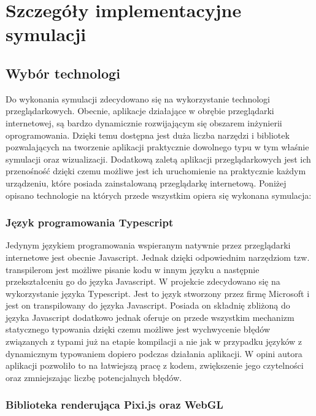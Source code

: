 \chapter{Szczegóły implementacyjne symulacji}
\label{cha:symulacja}

\section{Wybór technologi}

Do wykonania symulacji zdecydowano się na wykorzystanie technologi przeglądarkowych. Obecnie, aplikacje działające w obrębie przeglądarki internetowej, są bardzo dynamicznie rozwijającym się obszarem inżynierii oprogramowania. Dzięki temu dostępna jest duża liczba narzędzi i bibliotek pozwalających na tworzenie aplikacji praktycznie dowolnego typu w tym właśnie symulacji oraz wizualizacji. Dodatkową zaletą aplikacji przeglądarkowych jest ich przenośność dzięki czemu możliwe jest ich uruchomienie na praktycznie każdym urządzeniu, które posiada zainstalowaną przeglądarkę internetową.
Poniżej opisano technologie na których przede wszystkim opiera się wykonana symulacja:

\subsection{Język programowania Typescript}

Jedynym językiem programowania wspieranym natywnie przez przeglądarki internetowe jest obecnie Javascript. Jednak dzięki odpowiednim narzędziom tzw. transpilerom jest możliwe pisanie kodu w innym języku a następnie przekształceniu go do języka Javascript.
W projekcie zdecydowano się na wykorzystanie języka Typescript. Jest to język stworzony przez firmę Microsoft i jest on transpilowany do języka Javascript. Posiada on składnię zbliżoną do języka Javascript dodatkowo jednak oferuje on przede wszystkim mechanizm statycznego typowania dzięki czemu możliwe jest wychwycenie błędów związanych z typami już na etapie kompilacji a nie jak w przypadku języków z dynamicznym typowaniem dopiero podczas działania aplikacji. W opini autora aplikacji pozwoliło to na łatwiejszą pracę z kodem, zwiększenie jego czytelności oraz zmniejszając liczbę potencjalnych błędów.

\subsection{Biblioteka renderująca Pixi.js oraz WebGL}

